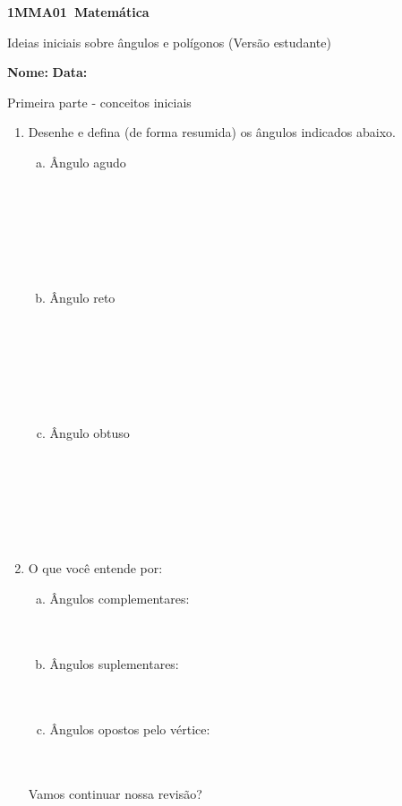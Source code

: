 \documentclass[a4paper,14pt]{article}
\begin{document}
	
	\noindent\textbf{1MMA01~Matemática} 
	
	\begin{center}Ideias iniciais sobre ângulos e polígonos (Versão estudante)
	\end{center}
	
	\noindent\textbf{Nome:} \underline{\hspace{10cm}}
	\noindent\textbf{Data:} \underline{\hspace{4cm}}
	
	
    \begin{multicols}{2}
    	Primeira parte - conceitos iniciais 
    	\begin{enumerate}
    		\item Desenhe e defina (de forma resumida) os ângulos indicados abaixo. 
    		\begin{enumerate}[a)]
    			\item Ângulo agudo \\\\\\\\\\\\\\
    			\item Ângulo reto \\\\\\\\\\\\\\
    			\item Ângulo obtuso \\\\\\\\\\\\\\
    		\end{enumerate}
    	    \item O que você entende por: 
    	    \begin{enumerate}[a)]
    	    	\item Ângulos complementares:  \\\\\\
    	    	\item Ângulos suplementares:  \\\\\\
    	    	\item Ângulos opostos pelo vértice:  \\\\\\
    	    \end{enumerate}
		        Vamos continuar nossa revisão? 
		        

\end{enumerate}
\end{multicols}
\end{document}
